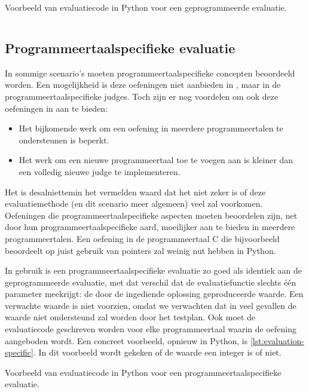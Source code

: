 \begin{listing}
    \caption{Voorbeeld van evaluatiecode in Python voor een geprogrammeerde evaluatie.}
    \label{lst:evaluation-lotto}
    \inputminted{python}{code/evaluator.py}
\end{listing}

\subsection{Programmeertaalspecifieke evaluatie}\label{subsec:programmeertaalspecifieke-evaluatie}

In sommige scenario's moeten programmeertaalspecifieke concepten beoordeeld worden.
Een mogelijkheid is deze oefeningen niet aanbieden in \tested{}, maar in de programmeertaalspecifieke judges.
Toch zijn er nog voordelen om ook deze oefeningen in \tested{} aan te bieden:
\begin{itemize}
    \item Het bijkomende werk om een oefening in meerdere programmeertalen te ondersteunen is beperkt.
    \item Het werk om een nieuwe programmeertaal toe te voegen aan \tested{} is kleiner dan een volledig nieuwe judge te implementeren.
\end{itemize}
Het is desalniettemin het vermelden waard dat het niet zeker is of deze evaluatiemethode (en dit scenario meer algemeen) veel zal voorkomen.
Oefeningen die programmeertaalspecifieke aspecten moeten beoordelen zijn, net door hun programmeertaalspecifieke aard, moeilijker aan te bieden in meerdere programmeertalen.
Een oefening in de programmeertaal C die bijvoorbeeld beoordeelt op juist gebruik van pointers zal weinig nut hebben in Python.

In gebruik is een programmeertaalspecifieke evaluatie zo goed als identiek aan de geprogrammeerde evaluatie, met dat verschil dat de evaluatiefunctie slechts één parameter meekrijgt: de door de ingediende oplossing geproduceerde waarde.
Een verwachte waarde is niet voorzien, omdat we verwachten dat in veel gevallen de waarde niet ondersteund zal worden door het testplan.
Ook moet de evaluatiecode geschreven worden voor elke programmeertaal waarin de oefening aangeboden wordt.
Een concreet voorbeeld, opnieuw in Python, is \cref{lst:evaluation-specific}.
In dit voorbeeld wordt gekeken of de waarde een integer is of niet.

\begin{listing}
    \caption{Voorbeeld van evaluatiecode in Python voor een programmeertaalspecifieke evaluatie.}
    \label{lst:evaluation-specific}
    \inputminted{python}{code/evaluator-specific.py}
\end{listing}

